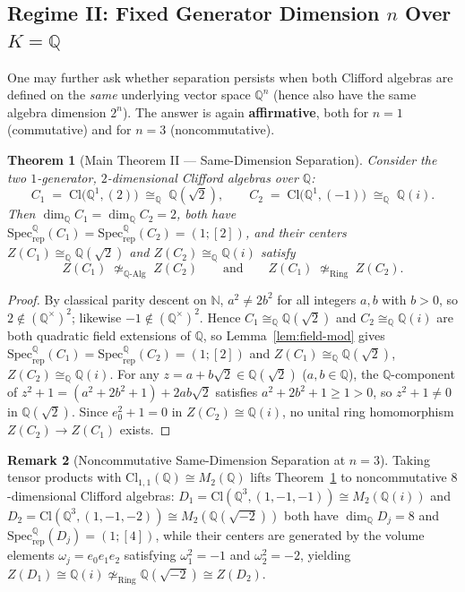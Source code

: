 \documentclass[11pt,a4paper]{article}
\theoremstyle{plain}
\newtheorem{theorem}{Theorem}[section]
\theoremstyle{definition}
\newtheorem{remark}[theorem]{Remark}
\newcommand{\Cl}{\mathrm{Cl}}
\newcommand{\Specrep}{\mathrm{Spec}_{\mathrm{rep}}}
\newcommand{\Mat}{M}
\newcommand{\Q}{\mathbb{Q}}
\begin{document}
\subsection{Regime II: Fixed Generator Dimension \texorpdfstring{$n$}{n} Over \texorpdfstring{$K = \Q$}{K = Q}}

One may further ask whether separation persists when both Clifford algebras are defined on the \emph{same} underlying vector space $\Q^n$ (hence also have the same algebra dimension $2^n$). The answer is again \textbf{affirmative}, both for $n = 1$ (commutative) and for $n = 3$ (noncommutative).

\begin{theorem}[Main Theorem II --- Same-Dimension Separation]\label{thm:regime-II}
Consider the two $1$-generator, $2$-dimensional Clifford algebras over $\Q$:
\[
  C_1 \;=\; \Cl\bigl(\Q^1, (2)\bigr) \;\cong_\Q\; \Q(\sqrt{2}),
  \qquad
  C_2 \;=\; \Cl\bigl(\Q^1, (-1)\bigr) \;\cong_\Q\; \Q(i).
\]
Then $\dim_\Q C_1 = \dim_\Q C_2 = 2$, both have $\Specrep^\Q(C_1) = \Specrep^\Q(C_2) = (1;[2])$, and their centers $Z(C_1) \cong_\Q \Q(\sqrt{2})$ and $Z(C_2) \cong_\Q \Q(i)$ satisfy
\[
  Z(C_1) \;\not\simeq_{\Q\text{-}\mathrm{Alg}}\; Z(C_2)
  \qquad\text{and}\qquad
  Z(C_1) \;\not\simeq_{\mathrm{Ring}}\; Z(C_2).
\]
\end{theorem}

\begin{proof}
By classical parity descent on $\mathbb{N}$, $a^2 \neq 2b^2$ for all integers $a, b$ with $b > 0$, so $2 \notin (\Q^\times)^2$; likewise $-1 \notin (\Q^\times)^2$. Hence $C_1 \cong_\Q \Q(\sqrt{2})$ and $C_2 \cong_\Q \Q(i)$ are both quadratic field extensions of $\Q$, so Lemma~\ref{lem:field-mod} gives $\Specrep^\Q(C_1) = \Specrep^\Q(C_2) = (1;[2])$ and $Z(C_1) \cong_\Q \Q(\sqrt{2})$, $Z(C_2) \cong_\Q \Q(i)$. For any $z = a + b\sqrt{2} \in \Q(\sqrt{2})$ ($a,b \in \Q$), the $\Q$-component of $z^2 + 1 = (a^2 + 2b^2 + 1) + 2ab\sqrt{2}$ satisfies $a^2 + 2b^2 + 1 \ge 1 > 0$, so $z^2 + 1 \neq 0$ in $\Q(\sqrt{2})$. Since $e_0^2 + 1 = 0$ in $Z(C_2) \cong \Q(i)$, no unital ring homomorphism $Z(C_2) \to Z(C_1)$ exists.
\end{proof}

\begin{remark}[Noncommutative Same-Dimension Separation at $n = 3$]
Taking tensor products with $\Cl_{1,1}(\Q) \cong \Mat_2(\Q)$ lifts Theorem~\ref{thm:regime-II} to noncommutative $8$-dimensional Clifford algebras: $D_1 = \Cl(\Q^3, (1,-1,-1)) \cong \Mat_2(\Q(i))$ and $D_2 = \Cl(\Q^3, (1,-1,-2)) \cong \Mat_2(\Q(\sqrt{-2}))$ both have $\dim_\Q D_j = 8$ and $\Specrep^\Q(D_j) = (1;[4])$, while their centers are generated by the volume elements $\omega_j = e_0 e_1 e_2$ satisfying $\omega_1^2 = -1$ and $\omega_2^2 = -2$, yielding $Z(D_1) \cong \Q(i) \not\simeq_{\mathrm{Ring}} \Q(\sqrt{-2}) \cong Z(D_2)$.
\end{remark}
\end{document}
